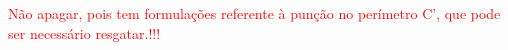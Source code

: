 
\textcolor{red}{Não apagar, pois tem formulações referente à punção no perímetro C', que pode ser necessário resgatar.!!!}











